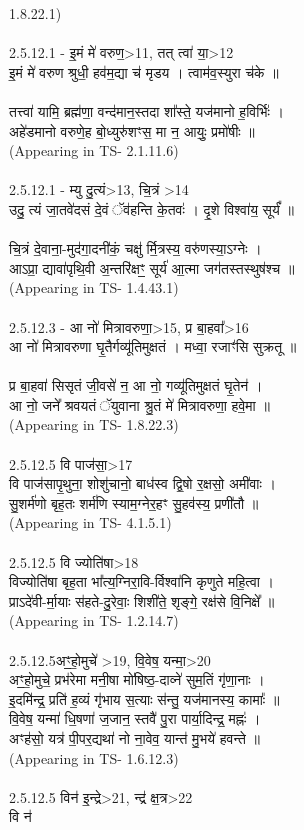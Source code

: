 \documentclass[17pt]{extarticle}
\begin{document}
1.8.22.1)\\\\2.5.12.1 - इ॒मं मे॑ वरुण॒>11, तत् त्वा॑ या॒>12\\इ॒मं मे॑ वरुण श्रुधी॒ हव॑म॒द्या च॑ मृडय । त्वाम॑व॒स्युरा च॑के ॥\\\\तत्त्वा॑ यामि॒ ब्रह्म॑णा॒ वन्द॑मान॒स्तदा शा᳚स्ते॒ यज॑मानो ह॒विर्भिः॑ । \\अहे॑डमानो वरुणे॒ह बो॒ध्युरु॑शꣳस॒ मा न॒ आयुः॒ प्रमो॑षीः ॥\\(Appearing in TS- 2.1.11.6)\\\\2.5.12.1 - म्यु दु॒त्यं>13, चि॒त्रं >14\\उदु॒ त्यं जा॒तवे॑दसं दे॒वं ॅव॑हन्ति के॒तवः॑ । दृ॒शे विश्वा॑य॒ सूर्यं᳚ ॥\\\\चि॒त्रं दे॒वाना॒-मुद॑गा॒दनी॑कं॒ चक्षु॑ र्मि॒त्रस्य॒ वरु॑णस्या॒ऽग्नेः ।\\आऽप्रा॒ द्यावा॑पृथि॒वी अ॒न्तरि॑क्षꣳ॒॒ सूर्य॑ आ॒त्मा जग॑तस्तस्थुष॑श्च ॥\\(Appearing in TS- 1.4.43.1)\\\\2.5.12.3 - आ नो॑ मित्रावरुणा॒>15, प्र बा॒हवा᳚>16\\आ नो॑ मित्रावरुणा घृ॒तैर्गव्यू॑तिमुक्षतं । मध्वा॒ रजाꣳ॑सि सुक्रतू ॥\\\\प्र बा॒हवा॑ सिसृतं जी॒वसे॑ न॒ आ नो॒ गव्यू॑तिमुक्षतं घृ॒तेन॑ । \\आ नो॒ जने᳚ श्रवयतं ॅयुवाना श्रु॒तं मे॑ मित्रावरुणा॒ हवे॒मा ॥\\(Appearing in TS- 1.8.22.3)\\\\2.5.12.5 वि पाज॑सा॒>17\\वि पाज॑सापृ॒थुना॒ शोशु॑चानो॒ बाध॑स्व द्वि॒षो र॒क्षसो॒ अमी॑वाः ।\\सु॒शर्म॑णो बृह॒तः शर्म॑णि स्याम॒ग्नेर॒हꣳ सु॒हव॑स्य॒ प्रणी॑तौ ॥\\(Appearing in TS- 4.1.5.1)\\\\2.5.12.5 वि ज्योति॑षा>18\\विज्योति॑षा बृह॒ता भा᳚त्य॒ग्निरा॒वि-र्विश्वा॑नि कृणुते महि॒त्वा ।\\प्राऽदे॑वी-र्मा॒याः स॑हते-दु॒रेवाः॒ शिशी॑ते॒ शृङ्गे॒ रक्ष॑से वि॒निक्षे᳚ ॥\\(Appearing in TS- 1.2.14.7)\\\\2.5.12.5अꣳ॒॒हो॒मुचे॑ >19, वि॒वेष॒ यन्मा॒>20\\अꣳ॒॒हो॒मुचे॒ प्रभ॑रेमा मनी॒षा मो॑षिष्ठ॒-दाव्ने॑ सुम॒तिं गृ॑णा॒नाः । \\इ॒दमि॑न्द्र॒ प्रति॑ ह॒व्यं गृ॑भाय स॒त्याः स॑न्तु॒ यज॑मानस्य॒ कामाः᳚ ॥ \\वि॒वेष॒ यन्मा॑ धि॒षणा॑ ज॒जान॒ स्तवै॑ पु॒रा पार्या॒दिन्द्र॒ मह्नः॑ । \\अꣳह॑सो॒ यत्र॑ पी॒पर॒द्यथा॑ नो ना॒वेव॒ यान्त॑ मु॒भये॑ हवन्ते ॥ \\(Appearing in TS- 1.6.12.3)\\\\2.5.12.5 विन॑ इ॒न्द्रे>21, न्द्र॑ क्ष॒त्र>22\\वि न॑ 
\end{document}
